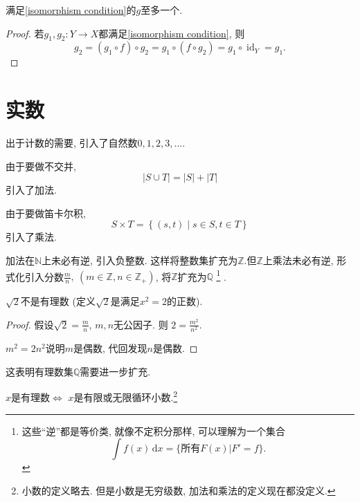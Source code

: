 \begin{proposition}
    满足\eqref{isomorphism condition}的$g$至多一个.
\end{proposition}

\begin{proof}
    若$g_1,g_2 \colon Y\to X$都满足\eqref{isomorphism condition}, 则
    \begin{equation}
      g_2=(g_1\circ f) \circ g_2 = g_1 \circ (f\circ g_2) = g_1\circ \operatorname{id}_{Y} = g_1.
    \end{equation}
\end{proof}


\section{实数}
出于计数的需要, 引入了自然数$0,1,2,3, \ldots $. 

由于要做不交并, 
\begin{equation}
  \left| S \cup T \right|  = |S| + |T|
\end{equation}
引入了加法.

由于要做笛卡尔积,
\begin{equation}
  S \times T = \left\{ (s,t) \middle| s\in S, t \in T \right\} 
\end{equation}
引入了乘法.

加法在$\mathbb{N}$上未必有逆, 引入负整数. 这样将整数集扩充为$\mathbb{Z}$.但$\mathbb{Z}$上乘法未必有逆, 形式化引入分数$\frac{m}{n} ,\ (m \in \mathbb{Z}, n \in \mathbb{Z}_+)$, 将$\mathbb{Z}$扩充为$\mathbb{Q}$
\footnote{这些``逆''都是等价类, 就像不定积分那样, 可以理解为一个集合
\begin{equation}
  \int f(x) \, \mathrm{d} x = \{\text{所有}F(x)| F' = f\}.
\end{equation}}
.

\begin{proposition}
    $\sqrt{2}$不是有理数 (定义$\sqrt{2}$是满足$x^2 = 2$的正数).
\end{proposition}
\begin{proof}
    假设$\sqrt{2} = \frac{m}{n}$, $m,n$无公因子. 则 $2 = \frac{m^2}{n^2}.$

    $m^2 = 2 n^2$说明$m$是偶数, 代回发现$n$是偶数.
\end{proof}

这表明有理数集$\mathbb{Q}$需要进一步扩充.

\begin{proposition}
    $x$是有理数$\iff$ $x$是有限或无限循环小数.\footnote{小数的定义略去. 但是小数是无穷级数, 加法和乘法的定义现在都没定义.}
\end{proposition}

